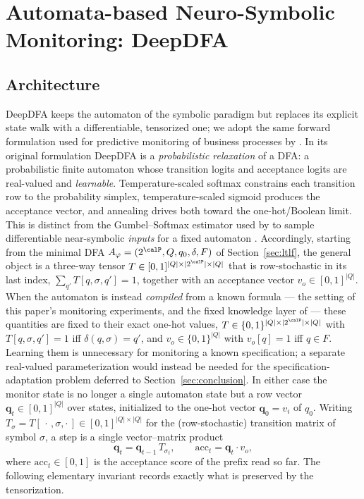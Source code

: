 \section{Automata-based Neuro-Symbolic Monitoring: DeepDFA}
\label{sec:deepdfa}

\subsection{Architecture}
\label{sec:deepdfa-arch}

DeepDFA \cite{deepdfa_ecai2024} keeps the automaton of the symbolic paradigm but replaces its explicit state walk with a differentiable, tensorized one; we adopt the same forward formulation used for predictive monitoring of business processes by \cite{mezini2025neuro}. In its original formulation DeepDFA is a \emph{probabilistic relaxation} of a DFA: a probabilistic finite automaton whose transition logits and acceptance logits are real-valued and \emph{learnable}. Temperature-scaled softmax constrains each transition row to the probability simplex, temperature-scaled sigmoid produces the acceptance vector, and annealing drives both toward the one-hot/Boolean limit. This is distinct from the Gumbel--Softmax estimator used by \cite{mezini2025neuro} to sample differentiable near-symbolic \emph{inputs} for a fixed automaton \cite{gumb_sftmx_1,gumb_sftmx_2}. Accordingly, starting from the minimal DFA $A_\varphi = (2^\calP, Q, q_0, \delta, F)$ of Section~\ref{sec:ltlf}, the general object is a three-way tensor $T \in [0,1]^{|Q| \times |2^\calP| \times |Q|}$ that is row-stochastic in its last index, $\sum_{q'} T[q, \sigma, q'] = 1$, together with an acceptance vector $v_o \in [0,1]^{|Q|}$. When the automaton is instead \emph{compiled} from a known \ltlf formula --- the setting of this paper's monitoring experiments, and the fixed knowledge layer of \cite{mezini2025neuro} --- these quantities are fixed to their exact one-hot values, $T \in \{0,1\}^{|Q| \times |2^\calP| \times |Q|}$ with $T[q, \sigma, q'] = 1$ iff $\delta(q, \sigma) = q'$, and $v_o \in \{0,1\}^{|Q|}$ with $v_o[q] = 1$ iff $q \in F$. Learning them is unnecessary for monitoring a known specification; a separate real-valued parameterization would instead be needed for the specification-adaptation problem deferred to Section~\ref{sec:conclusion}. In either case the monitor state is no longer a single automaton state but a row vector $\mathbf{q}_t \in [0,1]^{|Q|}$ over states, initialized to the one-hot vector $\mathbf{q}_0 = v_i$ of $q_0$. Writing $T_\sigma = T[\,\cdot\,, \sigma, \cdot\,] \in [0,1]^{|Q| \times |Q|}$ for the (row-stochastic) transition matrix of symbol $\sigma$, a step is a single vector--matrix product
\begin{equation}
  \mathbf{q}_t = \mathbf{q}_{t-1}\, T_{\sigma_t},
  \qquad
  \mathrm{acc}_t = \mathbf{q}_t \cdot v_o,
  \label{eq:deepdfa-crisp}
\end{equation}
where $\mathrm{acc}_t \in [0,1]$ is the acceptance score of the prefix read so far. The following elementary invariant records exactly what is preserved by the tensorization.

